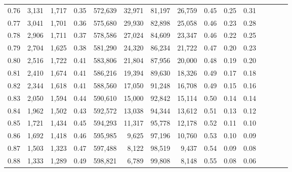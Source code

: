 \begin{tabular}{rrrcrrrrrrrrrrr}
0.76 &   3,131 &  1,717 &                                       0.35 &  572,639 &   32,971 &   81,197 &   26,759 &  0.45 &  0.25 &                         0.31 \\
0.77 &   3,041 &  1,701 &                                       0.36 &  575,680 &   29,930 &   82,898 &   25,058 &  0.46 &  0.23 &                         0.28 \\
0.78 &   2,906 &  1,711 &                                       0.37 &  578,586 &   27,024 &   84,609 &   23,347 &  0.46 &  0.22 &                         0.25 \\
0.79 &   2,704 &  1,625 &                                       0.38 &  581,290 &   24,320 &   86,234 &   21,722 &  0.47 &  0.20 &                         0.23 \\
0.80 &   2,516 &  1,722 &                                       0.41 &  583,806 &   21,804 &   87,956 &   20,000 &  0.48 &  0.19 &                         0.20 \\
0.81 &   2,410 &  1,674 &                                       0.41 &  586,216 &   19,394 &   89,630 &   18,326 &  0.49 &  0.17 &                         0.18 \\
0.82 &   2,344 &  1,618 &                                       0.41 &  588,560 &   17,050 &   91,248 &   16,708 &  0.49 &  0.15 &                         0.16 \\
0.83 &   2,050 &  1,594 &                                       0.44 &  590,610 &   15,000 &   92,842 &   15,114 &  0.50 &  0.14 &                         0.14 \\
0.84 &   1,962 &  1,502 &                                       0.43 &  592,572 &   13,038 &   94,344 &   13,612 &  0.51 &  0.13 &                         0.12 \\
0.85 &   1,721 &  1,434 &                                       0.45 &  594,293 &   11,317 &   95,778 &   12,178 &  0.52 &  0.11 &                         0.10 \\
0.86 &   1,692 &  1,418 &                                       0.46 &  595,985 &    9,625 &   97,196 &   10,760 &  0.53 &  0.10 &                         0.09 \\
0.87 &   1,503 &  1,323 &                                       0.47 &  597,488 &    8,122 &   98,519 &    9,437 &  0.54 &  0.09 &                         0.08 \\
0.88 &   1,333 &  1,289 &                                       0.49 &  598,821 &    6,789 &   99,808 &    8,148 &  0.55 &  0.08 &                         0.06 \\

\end{tabular}
